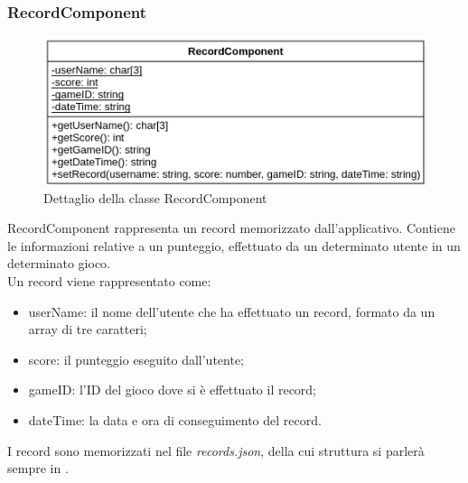 \subsubsection{RecordComponent}
\label{subsec:recordComponent}
\begin{figure}[h]
    \centering
    \includegraphics[width=340pt]{images/prog/Record.png}
    \caption{Dettaglio della classe RecordComponent}
    \label{fig:recordComponent}
\end{figure}
RecordComponent rappresenta un record memorizzato dall'applicativo. Contiene le informazioni relative a un punteggio, effettuato da un determinato utente in un determinato gioco.\\
Un record viene rappresentato come:
\begin{itemize}
    \item userName: il nome dell'utente che ha effettuato un record, formato da un array di tre caratteri;
    \item score: il punteggio eseguito dall'utente;
    \item gameID: l'ID del gioco dove si è effettuato il record;
    \item dateTime: la data e ora di conseguimento del record.
\end{itemize}
I record sono memorizzati nel file \emph{records.json}, della cui struttura si parlerà sempre in .
\newpage
